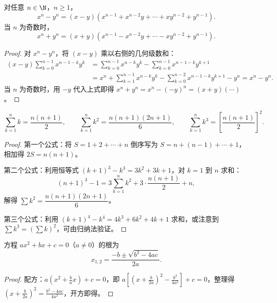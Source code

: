 \begin{proposition}
	对任意 $n \in \N$，$n \geqslant 1$，
	\[
	x^n - y^n = (x-y)(x^{n-1} + x^{n-2}y + \cdots + xy^{n-2} + y^{n-1}).
	\]
	当 $n$ 为奇数时，
	\[
	x^n + y^n = (x+y)(x^{n-1} - x^{n-2}y + \cdots - xy^{n-2} + y^{n-1}).
	\]
\end{proposition}

\begin{proof}
	对 $x^n - y^n$，将 $(x-y)$ 乘以右侧的几何级数和：
	\[
	\begin{aligned}
	(x-y)\sum_{k=0}^{n-1} x^{n-1-k}y^k &= \sum_{k=0}^{n-1} x^{n-k}y^k - \sum_{k=0}^{n-1} x^{n-1-k}y^{k+1} \\
	&= x^n + \sum_{k=1}^{n-1} x^{n-k}y^k - \sum_{k=0}^{n-2} x^{n-1-k}y^{k+1} - y^n = x^n - y^n.
	\end{aligned}
	\]
	当 $n$ 为奇数时，用 $-y$ 代入上式即得 $x^n + y^n = x^n - (-y)^n = (x+y)(\cdots)$。
\end{proof}

\begin{proposition}[前 $n$ 个正整数的方幂和]
	\[
	\sum_{k=1}^{n} k = \frac{n(n+1)}{2}, \qquad
	\sum_{k=1}^{n} k^2 = \frac{n(n+1)(2n+1)}{6}, \qquad
	\sum_{k=1}^{n} k^3 = \left[\frac{n(n+1)}{2}\right]^2.
	\]
\end{proposition}

\begin{proof}
	第一个公式：将 $S = 1+2+\cdots+n$ 倒序写为 $S = n+(n-1)+\cdots+1$，相加得 $2S = n(n+1)$。
	
	第二个公式：利用恒等式 $(k+1)^3 - k^3 = 3k^2 + 3k + 1$，对 $k=1$ 到 $n$ 求和：
	\[
	(n+1)^3 - 1 = 3\sum_{k=1}^{n} k^2 + 3\cdot\frac{n(n+1)}{2} + n,
	\]
	解得 $\sum k^2 = \dfrac{n(n+1)(2n+1)}{6}$。
	
	第三个公式：利用 $(k+1)^4 - k^4 = 4k^3 + 6k^2 + 4k + 1$ 求和，或注意到 $\sum k^3 = (\sum k)^2$，可由归纳法验证。
\end{proof}

\begin{proposition}[一元二次方程求根公式]
	方程 $ax^2 + bx + c = 0$（$a \neq 0$）的根为
	\[
	x_{1,2} = \frac{-b \pm \sqrt{b^2 - 4ac}}{2a}.
	\]
\end{proposition}

\begin{proof}
	配方：$a(x^2 + \frac{b}{a}x) + c = 0$，即 $a\left[(x+\frac{b}{2a})^2 - \frac{b^2}{4a^2}\right] + c = 0$，整理得 $(x+\frac{b}{2a})^2 = \frac{b^2-4ac}{4a^2}$，开方即得。
\end{proof}

